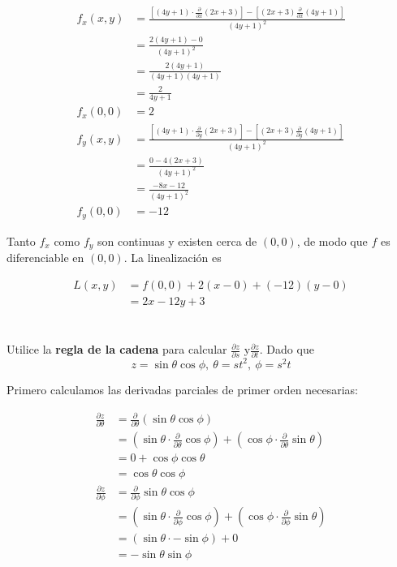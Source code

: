 \documentclass[12pt]{article}
\begin{document}
\begin{align*}
  f_x(x,y)
  &= \frac{\left[(4y +1)\cdot \frac{\partial}{\partial x} (2x+3)\right] - \left[(2x+3)\frac{\partial}{\partial x}(4y+1)\right]}{(4y +1)^2} \\
  &= \frac{2(4y+1)-0}{(4y +1)^2} \\
  &= \frac{2(4y+1)}{(4y +1)(4y+1)} \\
  &= \frac{2}{4y +1} \\
  f_x(0,0) &= 2 \\
  f_y(x,y)
  &= \frac{\left[(4y +1)\cdot \frac{\partial}{\partial y} (2x+3)\right] - \left[(2x+3)\frac{\partial}{\partial y}(4y+1)\right]}{(4y +1)^2} \\
  &= \frac{0-4(2x+3)}{(4y +1)^2} \\
  &= \frac{-8x-12}{(4y +1)^2} \\
  f_y(0,0)&=-12
\end{align*}

Tanto $f_x$ como $f_y$ son continuas y existen cerca de $(0,0)$, de modo que $f$ es diferenciable en $(0,0)$. La linealización es

\begin{align*}
  L(x,y)
  &= f(0,0) + 2(x-0) + (-12)(y-0) \\
  &= 2x -12y + 3
\end{align*}

\section{}

Utilice la \textbf{regla de la cadena} para calcular $\frac{\partial z}{\partial s}$ y$\frac{\partial z}{\partial t}$. Dado que
$$z = \sin{\theta}\cos{\phi}, ~ \theta = st^2, ~ \phi = s^2t$$ 

Primero calculamos las derivadas parciales de primer orden necesarias:

\begin{align*}
  \frac{\partial z}{\partial \theta}
  &= \frac{\partial}{\partial \theta} (\sin{\theta}\cos{\phi}) \\
  &= \left(\sin{\theta}\cdot\frac{\partial}{\partial \theta}\cos{\phi}\right) + \left(\cos{\phi}\cdot\frac{\partial}{\partial \theta}\sin{\theta}\right)\\
  &= 0 + \cos{\phi}\cos{\theta} \\
  &= \cos{\theta}\cos{\phi} \\
  \frac{\partial z}{\partial \phi}
  &= \frac{\partial}{\partial \phi} \sin{\theta}\cos{\phi} \\
  &= \left(\sin{\theta}\cdot\frac{\partial}{\partial \phi}\cos{\phi}\right) + \left(\cos{\phi}\cdot\frac{\partial}{\partial \phi}\sin{\theta}\right)\\
  &= (\sin{\theta} \cdot -\sin{\phi}) + 0 \\
  &= -\sin{\theta}\sin{\phi}
\end{align*}
\end{document}
